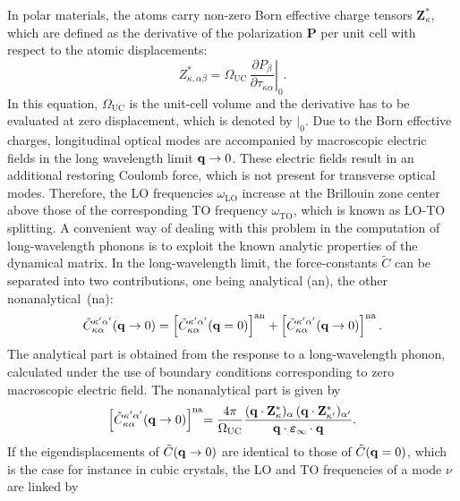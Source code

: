 In polar materials, the atoms carry non-zero Born effective charge tensors $\mathbf{Z}^*_\kappa$, which are defined as the derivative of the polarization $\mathbf{P}$ per unit cell   with respect to the atomic displacements:
%
\begin{equation}
    Z^*_{\kappa,\alpha\beta} = \Omega_\text{UC}\,\left.\frac{\partial P_\beta}{\partial\tau_{\kappa\alpha}}\right\vert_0.
\end{equation}
%
\newpage
In this equation, $\Omega_\text{UC}$ is the unit-cell volume and the derivative has to be evaluated at zero displacement, which is denoted by $\vert_0$. Due to the Born effective charges, longitudinal optical modes are accompanied by macroscopic electric fields in the long wavelength limit $\mathbf{q}\rightarrow0$. These electric fields result in an additional restoring Coulomb force, which is not present for transverse optical modes. Therefore, the LO frequencies $\omega^{\phantom{I}}_\text{LO}$ increase at the Brillouin zone center above those of the corresponding TO frequency $\omega^{\phantom{I}}_\text{TO}$, which is known as LO-TO splitting\cite{cardona2005fundamentals}. A convenient way of dealing with this problem in the computation of long-wavelength phonons is to exploit the known analytic properties of the dynamical matrix\cite{pavone_phonons}. In the long-wavelength limit, the force-constants $\tilde{C}$ can be separated into two contributions, one being analytical (an), the other nonanalytical~(na):
%
\begin{align}
    \tilde{C}_{\kappa\alpha}^{\kappa'\alpha'}(\mathbf{q}\rightarrow0) = \left[\tilde{C}_{\kappa\alpha}^{\kappa'\alpha'}(\mathbf{q}=0)\right]^\text{an} + \left[\tilde{C}_{\kappa\alpha}^{\kappa'\alpha'}(\mathbf{q}\to 0)\right]^\text{na}.
\end{align}
%
The analytical part is obtained from the response to a long-wavelength phonon, calculated under the use of boundary conditions corresponding to zero macroscopic electric field. The nonanalytical part is given by\cite{pavone_phonons}
%
\begin{align}\label{forceconst_an}
   \left[\tilde{C}_{\kappa\alpha}^{\kappa'\alpha'}(\mathbf{q}\to 0)\right]^\text{na\!\!} = \frac{4\pi}{\Omega_\text{UC}}\frac{(\mathbf{q}\cdot \mathbf{Z}^*_\kappa)_\alpha\,(\mathbf{q}\cdot \mathbf{Z}^*_{\kappa'})_{\alpha'}}{\mathbf{q\cdot\boldsymbol{\varepsilon}_\infty \cdot q}}.
\end{align}
%
 If the eigendisplacements of $\tilde{C}(\mathbf{q}\rightarrow0)$ are identical to those of $\tilde{C}(\mathbf{q}=0)$, which is the case for instance in cubic crystals, the LO and TO frequencies of a mode $\nu$ are linked by\cite{gonze_lee}
